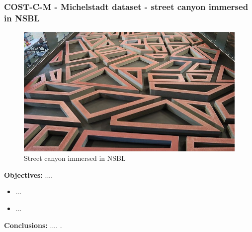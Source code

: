 \subsubsection{COST-C-M - Michelstadt dataset - street canyon immersed in NSBL}
    \begin{figure}[h!]
        \hypertarget{link:cost_m}{}
        \centering
        \includegraphics[scale=0.6]{imgs/michelstad.jpg}
        \caption{Street canyon immersed in NSBL}
    \end{figure}
    \textbf{Objectives:} ....\newline
    \begin{itemize}
        \item ...
        \item ...
    \end{itemize}
    \textbf{Conclusions:} .... .\newline
